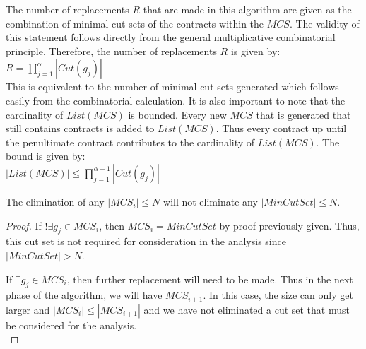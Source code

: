 The number of replacements $R$ that are made in this algorithm are given as the combination of minimal cut sets of the contracts within the $MCS$. The validity of this statement follows directly from the general multiplicative combinatorial principle. Therefore, the number of replacements $R$ is given by:\\

$R = {\displaystyle \prod_{j=1}^{\alpha } |Cut(g_j)|}$ \\

This is equivalent to the number of minimal cut sets generated which follows easily from the combinatorial calculation. It is also important to note that the cardinality of $List(MCS)$ is bounded. Every new $MCS$ that is generated that still contains contracts is added to $List(MCS)$. Thus every contract up until the penultimate contract contributes to the cardinality of $List(MCS)$. The bound is given by: \\

$|List(MCS)| \leq {\displaystyle \prod_{j=1}^{\alpha -1} |Cut(g_j)|}$\\

\begin{theorem} 
The elimination of any $|MCS_i| \leq N$ will not eliminate any $|MinCutSet| \leq N$. \\

\begin{proof} 

If $!\exists g_j \in MCS_i$, then $MCS_i = MinCutSet$ by proof previously given. Thus, this cut set is not required for consideration in the analysis since $|MinCutSet| > N$. 

If $\exists g_j \in MCS_i$, then further replacement will need to be made. Thus in the next phase of the algorithm, we will have $MCS_{i+1}$. In this case, the size can only get larger and $|MCS_i| \leq |MCS_{i+1}|$ and we have not eliminated a cut set that must be considered for the analysis. \\

\end{proof}
\end{theorem}





































